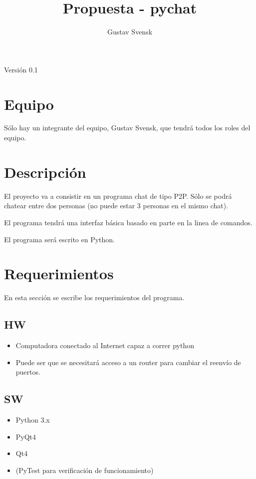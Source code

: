 \documentclass[a4paper, 12pt]{article}
\title{Propuesta - pychat}
\author{Gustav Svensk}
\begin{document}
\cfoot{\thepage}
\renewcommand{\headrulewidth}{0.4pt}


\maketitle
\thispagestyle{empty}
\begin{center}
        {\large Versión 0.1}
\end{center}
\newpage
\setcounter{page}{1}

\section{Equipo}
Sólo hay un integrante del equipo, Gustav Svensk, que tendrá todos los roles del
equipo.
\section{Descripción}
El proyecto va a consistir en un programa chat de tipo P2P. Sólo se
podrá chatear entre dos personas (no puede estar 3 personas en el mismo
chat).

El programa tendrá una interfaz básica basado en parte en la linea de comandos.

El programa será escrito en Python.
\section{Requerimientos}
En esta sección se escribe los requerimientos del programa.
\subsection{HW}
\begin{itemize}
        \item Computadora conectado al Internet capaz a correr python
        \item Puede ser que se necesitará acceso a un router para cambiar el
                reenvío de puertos.
\end{itemize}
\subsection{SW}
\begin{itemize}
        \item Python 3.x
        \item PyQt4
        \item Qt4
        \item (PyTest para verificación de funcionamiento)
\end{itemize}
\end{document}
